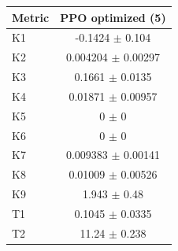 \begin{tabular}{lc}
\toprule
Metric & PPO optimized (5) \\
\midrule
K1 & -0.1424 $\pm$ 0.104 \\
K2 & 0.004204 $\pm$ 0.00297 \\
K3 & 0.1661 $\pm$ 0.0135 \\
K4 & 0.01871 $\pm$ 0.00957 \\
K5 & 0 $\pm$ 0 \\
K6 & 0 $\pm$ 0 \\
K7 & 0.009383 $\pm$ 0.00141 \\
K8 & 0.01009 $\pm$ 0.00526 \\
K9 & 1.943 $\pm$ 0.48 \\
T1 & 0.1045 $\pm$ 0.0335 \\
T2 & 11.24 $\pm$ 0.238 \\
\bottomrule
\end{tabular}
